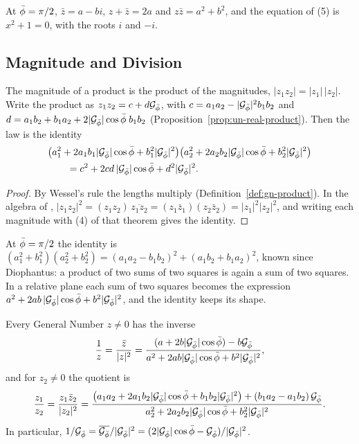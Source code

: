 \incomplex At $\bar{\phi} = \pi/2$, $\bar{z} = a - bi$, $z + \bar{z} = 2a$ and $z\bar{z} = a^2 + b^2$, and the equation of (5) is $x^2 + 1 = 0$, with the roots $i$ and $-i$.

\subsection{Magnitude and Division}\label{subsec:gn-division}

\begin{theorem}\label{thm:gn-two-squares}
The magnitude of a product is the product of the magnitudes, $|z_1 z_2| = |z_1|\,|z_2|$. Write the product as $z_1 z_2 = c + d\mathcal{G}_{\bar{\phi}}$, with $c = a_1 a_2 - |\mathcal{G}_{\bar{\phi}}|^2 b_1 b_2$ and $d = a_1 b_2 + b_1 a_2 + 2|\mathcal{G}_{\bar{\phi}}|\cos\bar{\phi}\; b_1 b_2$ (Proposition~\ref{prop:un-real-product}). Then the law is the identity
\begin{align*}
&\bigl(a_1^2 + 2a_1b_1|\mathcal{G}_{\bar{\phi}}|\cos\bar{\phi} + b_1^2|\mathcal{G}_{\bar{\phi}}|^2\bigr)\bigl(a_2^2 + 2a_2b_2|\mathcal{G}_{\bar{\phi}}|\cos\bar{\phi} + b_2^2|\mathcal{G}_{\bar{\phi}}|^2\bigr) \\
&\qquad = c^2 + 2cd\,|\mathcal{G}_{\bar{\phi}}|\cos\bar{\phi} + d^2|\mathcal{G}_{\bar{\phi}}|^2 .
\end{align*}
\end{theorem}

\begin{proof}
By Wessel's rule the lengths multiply (Definition~\ref{def:gn-product}). In the algebra of , $|z_1z_2|^2 = (z_1z_2)\,\overline{z_1z_2} = (z_1\bar{z}_1)(z_2\bar{z}_2) = |z_1|^2|z_2|^2$, and writing each magnitude with (4) of that theorem gives the identity.
\end{proof}

\incomplex At $\bar{\phi} = \pi/2$ the identity is $(a_1^2 + b_1^2)(a_2^2 + b_2^2) = (a_1a_2 - b_1b_2)^2 + (a_1b_2 + b_1a_2)^2$, known since Diophantus: a product of two sums of two squares is again a sum of two squares. In a relative plane each sum of two squares becomes the expression $a^2 + 2ab\,|\mathcal{G}_{\bar{\phi}}|\cos\bar{\phi} + b^2|\mathcal{G}_{\bar{\phi}}|^2$, and the identity keeps its shape.

\begin{theorem}[Division]\label{thm:gn-division}
Every General Number $z \neq 0$ has the inverse
\[
\frac{1}{z} = \frac{\bar{z}}{|z|^2} = \frac{(a + 2b|\mathcal{G}_{\bar{\phi}}|\cos\bar{\phi}) - b\mathcal{G}_{\bar{\phi}}}{a^2 + 2ab|\mathcal{G}_{\bar{\phi}}|\cos\bar{\phi} + b^2|\mathcal{G}_{\bar{\phi}}|^2} ,
\]
and for $z_2 \neq 0$ the quotient is
\[
\frac{z_1}{z_2} = \frac{z_1\bar{z}_2}{|z_2|^2} = \frac{\bigl(a_1a_2 + 2a_1b_2|\mathcal{G}_{\bar{\phi}}|\cos\bar{\phi} + b_1b_2|\mathcal{G}_{\bar{\phi}}|^2\bigr) + (b_1a_2 - a_1b_2)\,\mathcal{G}_{\bar{\phi}}}{a_2^2 + 2a_2b_2|\mathcal{G}_{\bar{\phi}}|\cos\bar{\phi} + b_2^2|\mathcal{G}_{\bar{\phi}}|^2} .
\]
In particular, $1/\mathcal{G}_{\bar{\phi}} = \overline{\mathcal{G}_{\bar{\phi}}}/|\mathcal{G}_{\bar{\phi}}|^2 = (2|\mathcal{G}_{\bar{\phi}}|\cos\bar{\phi} - \mathcal{G}_{\bar{\phi}})/|\mathcal{G}_{\bar{\phi}}|^2$.
\end{theorem}

